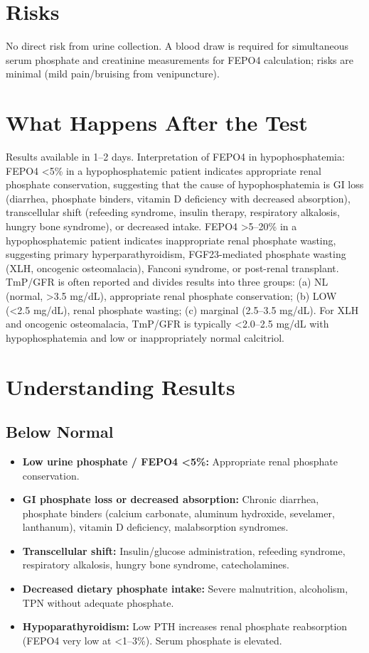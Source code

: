 \section*{Risks}
No direct risk from urine collection. A blood draw is required for simultaneous serum phosphate and creatinine measurements for FEPO4 calculation; risks are minimal (mild pain/bruising from venipuncture).

\section*{What Happens After the Test}
Results available in 1--2 days. Interpretation of FEPO4 in hypophosphatemia: FEPO4 <5\% in a hypophosphatemic patient indicates appropriate renal phosphate conservation, suggesting that the cause of hypophosphatemia is GI loss (diarrhea, phosphate binders, vitamin D deficiency with decreased absorption), transcellular shift (refeeding syndrome, insulin therapy, respiratory alkalosis, hungry bone syndrome), or decreased intake. FEPO4 >5--20\% in a hypophosphatemic patient indicates inappropriate renal phosphate wasting, suggesting primary hyperparathyroidism, FGF23-mediated phosphate wasting (XLH, oncogenic osteomalacia), Fanconi syndrome, or post-renal transplant. TmP/GFR is often reported and divides results into three groups: (a) NL (normal, >3.5 mg/dL), appropriate renal phosphate conservation; (b) LOW (<2.5 mg/dL), renal phosphate wasting; (c) marginal (2.5--3.5 mg/dL). For XLH and oncogenic osteomalacia, TmP/GFR is typically <2.0--2.5 mg/dL with hypophosphatemia and low or inappropriately normal calcitriol.

\section*{Understanding Results}

\subsection*{Below Normal}
\begin{itemize}
  \item \textbf{Low urine phosphate / FEPO4 <5\%:} Appropriate renal phosphate conservation.
  \item \textbf{GI phosphate loss or decreased absorption:} Chronic diarrhea, phosphate binders (calcium carbonate, aluminum hydroxide, sevelamer, lanthanum), vitamin D deficiency, malabsorption syndromes.
  \item \textbf{Transcellular shift:} Insulin/glucose administration, refeeding syndrome, respiratory alkalosis, hungry bone syndrome, catecholamines.
  \item \textbf{Decreased dietary phosphate intake:} Severe malnutrition, alcoholism, TPN without adequate phosphate.
  \item \textbf{Hypoparathyroidism:} Low PTH increases renal phosphate reabsorption (FEPO4 very low at <1--3\%). Serum phosphate is elevated.
\end{itemize}


